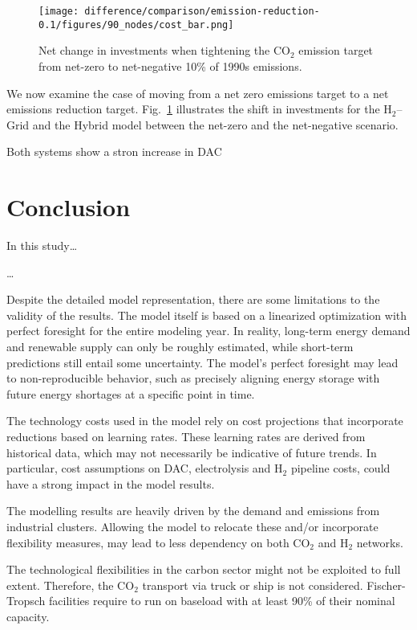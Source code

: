 \documentclass[twocolumn]{article}
\newcommand{\carbon}{CO$_2$}
\newcommand{\hydrogen}{H$_2$}
\newcommand{\hydrogengrid}{\hydrogen{}--Grid}
\begin{document}
\begin{figure}[htb!]
    \centering
    \texttt{[image: difference/comparison/emission-reduction-0.1/figures/90\_nodes/cost\_bar.png]}
    \caption[short]{Net change in investments when tightening the \carbon{} emission target from net-zero to net-negative 10\% of 1990s emissions.}
    \label{fig:net-negative_cost_bar}
\end{figure}


We now examine the case of moving from a net zero emissions target to a net emissions reduction target. Fig.~\ref{fig:net-negative_cost_bar} illustrates the shift in investments for the \hydrogengrid{} and the Hybrid model between the net-zero and the net-negative scenario.

Both systems show a stron increase in DAC


\section{Conclusion}
\label{sec:conclusion}



In this study\dots

\dots

Despite the detailed model representation, there are some limitations to the validity of the results. The model itself is based on a linearized optimization with perfect foresight for the entire modeling year. In reality, long-term energy demand and renewable supply can only be roughly estimated, while short-term predictions still entail some uncertainty. The model's perfect foresight may lead to non-reproducible behavior, such as precisely aligning energy storage with future energy shortages at a specific point in time.

The technology costs used in the model rely on cost projections that incorporate reductions based on learning rates. These learning rates are derived from historical data, which may not necessarily be indicative of future trends. In particular, cost assumptions on DAC, electrolysis and \hydrogen{} pipeline costs, could have a strong impact in the model results.

The modelling results are heavily driven by the demand and emissions from industrial clusters. Allowing the model to relocate these and/or incorporate flexibility measures, may lead to less dependency on both \carbon{} and \hydrogen{} networks.

The technological flexibilities in the carbon sector might not be exploited to full extent. Therefore, the \carbon{} transport via truck or ship is not considered. Fischer-Tropsch facilities require to run on baseload with at least 90\% of their nominal capacity.
\end{document}
